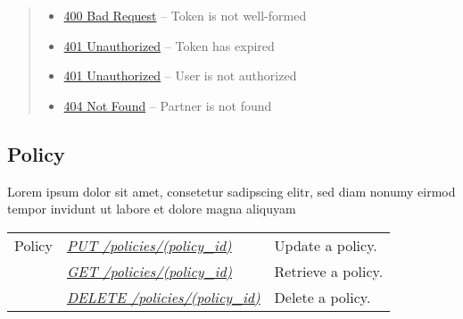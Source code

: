 \documentclass[letterpaper,10pt,english]{sphinxmanual}
\begin{document}
\begin{fulllineitems}
\begin{quote}
\begin{description}
\begin{itemize}
\item {} 
\href{http://www.w3.org/Protocols/rfc2616/rfc2616-sec10.html\#sec10.4.1}{400 Bad Request} -- Token is not well-formed

\item {} 
\href{http://www.w3.org/Protocols/rfc2616/rfc2616-sec10.html\#sec10.4.2}{401 Unauthorized} -- Token has expired

\item {} 
\href{http://www.w3.org/Protocols/rfc2616/rfc2616-sec10.html\#sec10.4.2}{401 Unauthorized} -- User is not authorized

\item {} 
\href{http://www.w3.org/Protocols/rfc2616/rfc2616-sec10.html\#sec10.4.5}{404 Not Found} -- Partner is not found

\end{itemize}

\end{description}\end{quote}

\end{fulllineitems}



\subsection{Policy}
\label{\detokenize{resources/policy::doc}}\label{\detokenize{resources/policy:policy}}
Lorem ipsum dolor sit amet, consetetur sadipscing elitr, sed diam nonumy eirmod tempor invidunt ut labore et dolore magna aliquyam

\noindent\begin{tabulary}{\linewidth}{|L|L|L|}
\hline
{}\relax &\relax &\relax \\
\hline
Policy
&
{\hyperref[\detokenize{resources/policy:put--policies-(policy_id)}]{\emph{PUT /policies/(policy\_id)}}}
&
Update a policy.
\\
\hline&
{\hyperref[\detokenize{resources/policy:get--policies-(policy_id)}]{\emph{GET /policies/(policy\_id)}}}
&
Retrieve a policy.
\\
\hline&
{\hyperref[\detokenize{resources/policy:delete--policies-(policy_id)}]{\emph{DELETE /policies/(policy\_id)}}}
&
Delete a policy.
\\
\hline\end{tabulary}


\begin{DUlineblock}{0em}
\item[] 
\end{DUlineblock}
\end{document}
